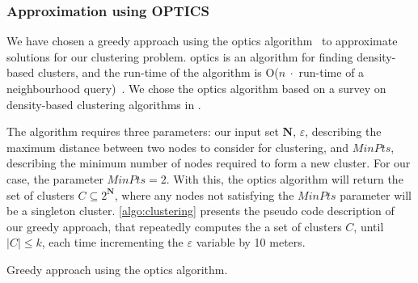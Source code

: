 

\subsubsection{Approximation using OPTICS}
We have chosen a greedy approach using the \gls{optics} algorithm~\cite{Ankerst:1999:OOP:304182.304187} to approximate solutions for our clustering problem. \gls{optics} is an algorithm for finding density-based clusters, and the run-time of the algorithm is O($n \ \cdot $ run-time of a neighbourhood query)~\cite[p.~53]{Ankerst:1999:OOP:304182.304187}. We chose the \gls{optics} algorithm based on a survey on density-based clustering algorithms in \cite{proceeding:clustering-Survey}.\smallbreak

The algorithm requires three parameters: our input set $\textbf{N}$, $\varepsilon$, describing the maximum distance between two nodes to consider for clustering, and $MinPts$, describing the minimum number of nodes required to form a new cluster. For our case, the parameter $MinPts = 2$. With this, the \gls{optics} algorithm will return the set of clusters $C \subseteq 2^{\textbf{N}}$, where any nodes not satisfying the $MinPts$ parameter will be a singleton cluster. \autoref{algo:clustering} presents the pseudo code description of our greedy approach, that repeatedly computes the a set of clusters $C$, until $|C| \leq k$, each time incrementing the $\varepsilon$ variable by 10 meters.

\begin{algorithm}[H]
    \DontPrintSemicolon

    \caption{Greedy approach using the \gls{optics} algorithm.}
    \label{algo:clustering}
\end{algorithm}

